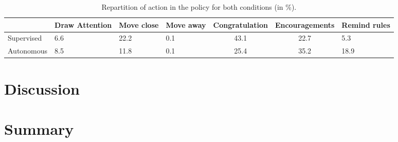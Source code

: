 \begin{table}[ht]
	\centering
	\caption{Repartition of action in the policy for both conditions (in \%).}
	\label{tab:policies}
	\begin{tabularx}{\textwidth}{@{}lYYYccY}\toprule
		& Draw \newline Attention & Move \newline close & Move \newline away & Congratulation & Encouragements & Remind \newline rules \\
		\midrule
		Supervised & 6.6  & 22.2 & 0.1 & 43.1 & 22.7 & 5.3 \\
		Autonomous & 8.5 & 11.8 & 0.1 & 25.4 & 35.2 & 18.9\\
		\bottomrule
	\end{tabularx}
\end{table}

\section{Discussion}

\section{Summary}


